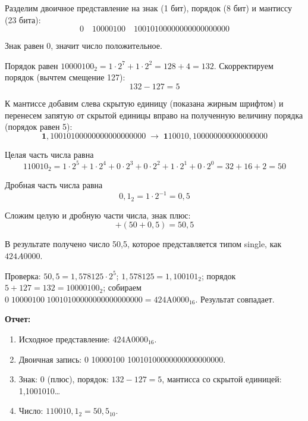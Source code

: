 \documentclass[a4paper, 12pt]{article}
\begin{document}
Разделим двоичное представление на знак (1 бит), порядок (8 бит) и мантиссу (23 бита):
$$0 \quad 10000100 \quad 10010100000000000000000$$

Знак равен 0, значит число положительное.

Порядок равен $10000100_2 = 1 \cdot 2^7 + 1 \cdot 2^2 = 128 + 4 = 132$. Скорректируем порядок
(вычтем смещение 127):
$$132 - 127 = 5$$

К мантиссе добавим слева скрытую единицу (показана жирным шрифтом) и перенесем запятую от скрытой
единицы вправо на полученную величину порядка (порядок равен 5):
$$\mathbf{1},10010100000000000000000 \;\rightarrow\; \mathbf{1}10010{,}100000000000000000$$

Целая часть числа равна
$$110010_2 = 1 \cdot 2^5 + 1 \cdot 2^4 + 0 \cdot 2^3 + 0 \cdot 2^2 + 1 \cdot 2^1 + 0 \cdot 2^0 = 32 + 16 + 2 = 50$$

Дробная часть числа равна
$$0{,}1_2 = 1 \cdot 2^{-1} = 0{,}5$$

Сложим целую и дробную части числа, знак плюс:
$$+(50 + 0{,}5) = 50{,}5$$

В результате получено число 50,5, которое представляется типом single, как $424A0000$.

Проверка: $50{,}5 = 1{,}578125 \cdot 2^5$; $1{,}578125 = 1{,}100101_2$; порядок $5 + 127 = 132 = 10000100_2$;
собираем $0\;10000100\;10010100000000000000000 = \mathrm{424A0000}_{16}$. Результат совпадает.
\vspace{1cm}

\textbf{Отчет:}
\begin{enumerate}[nosep]
    \item Исходное представление: $\mathrm{424A0000}_{16}$.
    \item Двоичная запись: 0 10000100 10010100000000000000000.
    \item Знак: 0 (плюс), порядок: $132 - 127 = 5$, мантисса со скрытой единицей: 1,1001010\ldots
    \item Число: $110010{,}1_2 = 50{,}5_{10}$.
\end{enumerate}
\end{document}
